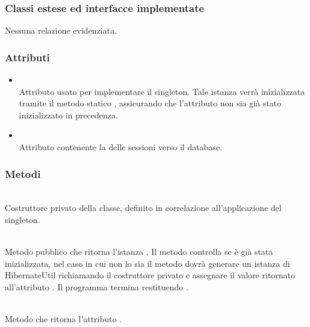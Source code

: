 \subsubsection*{Classi estese ed interfacce implementate}

Nessuna relazione evidenziata.


\subsubsection*{Attributi}

\begin{itemize}
	\item{}\\
	Attributo usato per implementare il  singleton. Tale istanza verrà inizializzata tramite il metodo statico , assicurando che l'attributo non sia già stato inizializzato in precedenza.
	\item{}\\
	Attributo contenente la  delle sessioni verso il database.
\end{itemize}

\subsubsection*{Metodi}

\begin{description}
	\item{}\\
	Costruttore privato della classe, definito  in correlazione all'applicazione del  singleton.
	\item{}\\
	Metodo pubblico che ritorna l'istanza . Il metodo controlla se  è già stata inizializzata, nel caso in cui non lo sia il metodo dovrà generare un istanza di HibernateUtil richiamando il costruttore privato  e assegnare il valore ritornato all'attributo . Il programma termina restituendo .
	\item{}\\
	Metodo che ritorna l'attributo .
\end{description}

